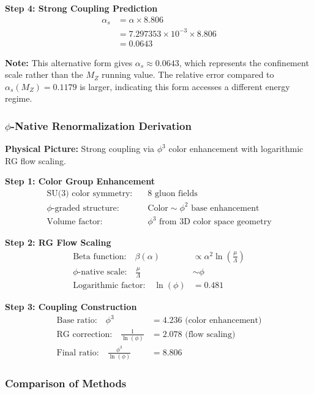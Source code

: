 \textbf{Step 4: Strong Coupling Prediction}
\begin{align}
\alpha_s &= \alpha \times 8.806\\
&= 7.297353 \times 10^{-3} \times 8.806\\
&= 0.0643
\end{align}

\textbf{Note:} This alternative form gives $\alpha_s \approx 0.0643$, which represents the confinement scale rather than the $M_Z$ running value. The relative error compared to $\alpha_s(M_Z) = 0.1179$ is larger, indicating this form accesses a different energy regime.

\subsubsection{$\phi$-Native Renormalization Derivation}

\textbf{Physical Picture:} Strong coupling via $\phi^3$ color enhancement with logarithmic RG flow scaling.

\textbf{Step 1: Color Group Enhancement}
\begin{align}
\text{SU(3) color symmetry:} \quad &8 \text{ gluon fields}\\
\text{$\phi$-graded structure:} \quad &\text{Color} \sim \phi^2 \text{ base enhancement}\\
\text{Volume factor:} \quad &\phi^3 \text{ from 3D color space geometry}
\end{align}

\textbf{Step 2: RG Flow Scaling}
\begin{align}
\text{Beta function:} \quad \beta(\alpha) &\propto \alpha^2 \ln\left(\frac{\mu}{\Lambda}\right)\\
\text{$\phi$-native scale:} \quad \frac{\mu}{\Lambda} &\sim \phi\\
\text{Logarithmic factor:} \quad \ln(\phi) &= 0.481
\end{align}

\textbf{Step 3: Coupling Construction}
\begin{align}
\text{Base ratio:} \quad \phi^3 &= 4.236 \text{ (color enhancement)}\\
\text{RG correction:} \quad \frac{1}{\ln(\phi)} &= 2.078 \text{ (flow scaling)}\\
\text{Final ratio:} \quad \frac{\phi^3}{\ln(\phi)} &= 8.806
\end{align}

\subsubsection{Comparison of Methods}

